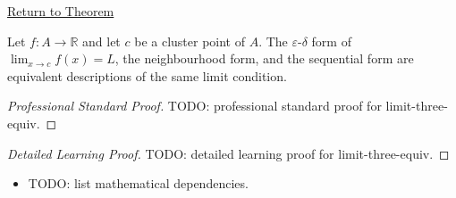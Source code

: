 \newpage
{}
\label{prf:limit-three-equiv}

\begin{remark*}[Return]
\hyperref[cor:limit-three-equiv]{Return to Theorem}
\end{remark*}

\begin{theorem*}
Let $f : A \to \mathbb{R}$ and let $c$ be a cluster point of $A$.
The $\varepsilon$-$\delta$ form of $\lim_{x\to c}f(x)=L$, the
neighbourhood form, and the sequential form are equivalent descriptions
of the same limit condition.

\smallskip\noindent
\end{theorem*}

\begin{proof}[Professional Standard Proof]
\LRAProofBodyStart
TODO: professional standard proof for limit-three-equiv.
\end{proof}

\begin{proof}[Detailed Learning Proof]
\LRAProofBodyStart
TODO: detailed learning proof for limit-three-equiv.
\end{proof}

\begin{remark*}
\end{remark*}

\begin{dependencies}
\begin{itemize}
  \item TODO: list mathematical dependencies.
\end{itemize}
\end{dependencies}

\clearpage
